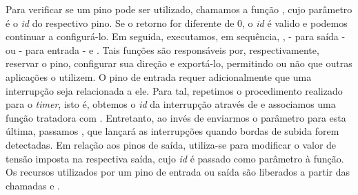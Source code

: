 Para verificar se um pino pode ser utilizado, chamamos a função
, cujo parâmetro é o \textit{id} do respectivo pino. Se o
retorno for diferente de 0, o \textit{id} é valido e podemos continuar a
configurá-lo. Em seguida, executamos, em sequência,
,  - para saída - ou
 - para entrada - e . Tais
funções são responsáveis por, respectivamente, reservar o pino, configurar sua
direção e exportá-lo, permitindo ou não que outras aplicações o utilizem. O pino
de entrada requer adicionalmente que uma interrupção seja relacionada a ele.
Para tal, repetimos o procedimento realizado para o \textit{timer}, isto é,
obtemos o \textit{id} da interrupção através de  e associamos
uma função tratadora com . Entretanto, ao invés de enviarmos
o parâmetro  para esta última, passamos
, que lançará as interrupções quando bordas de subida
forem detectadas. Em relação aos pinos de saída, utiliza-se 
 para modificar o valor de tensão imposta na respectiva
saída, cujo \textit{id} é passado como parâmetro à função. Os recursos
utilizados por um pino de entrada ou saída são liberados a partir das chamadas
 e .

\vspace{12pt}

